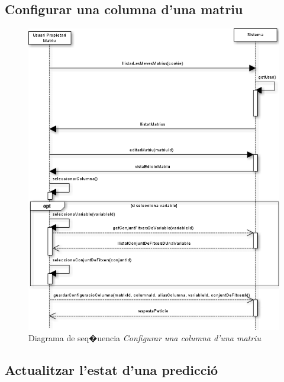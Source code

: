 \subsection*{Configurar una columna d'una matriu}
\begin{figure}[H]
  \centering
  \includegraphics[scale=0.6]{img/specification/SequenceConfigureColumn.png}
  \caption{Diagrama de seq�{u}encia \textit{Configurar una columna d'una matriu} }
  \label{fig:sequenceconfigurecolumn}
\end{figure}

\subsection*{Actualitzar l'estat d'una predicci\'{o}}